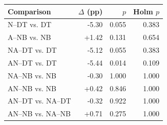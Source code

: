 \begin{tabular}{lrrr}
\toprule
Comparison & $\Delta$ (pp) & $p$ & Holm $p$ \\
\midrule
N--DT vs. DT & -5.30 & 0.055 & 0.383 \\
A--NB vs. NB & +1.42 & 0.131 & 0.654 \\
NA--DT vs. DT & -5.12 & 0.055 & 0.383 \\
AN--DT vs. DT & -5.44 & 0.014 & 0.109 \\
NA--NB vs. NB & -0.30 & 1.000 & 1.000 \\
AN--NB vs. NB & +0.42 & 0.846 & 1.000 \\
AN--DT vs. NA--DT & -0.32 & 0.922 & 1.000 \\
AN--NB vs. NA--NB & +0.71 & 0.275 & 1.000 \\
\bottomrule
\end{tabular}
